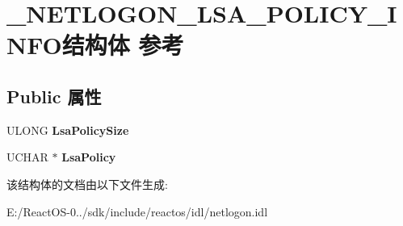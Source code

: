 \hypertarget{struct___n_e_t_l_o_g_o_n___l_s_a___p_o_l_i_c_y___i_n_f_o}{}\section{\+\_\+\+N\+E\+T\+L\+O\+G\+O\+N\+\_\+\+L\+S\+A\+\_\+\+P\+O\+L\+I\+C\+Y\+\_\+\+I\+N\+F\+O结构体 参考}
\label{struct___n_e_t_l_o_g_o_n___l_s_a___p_o_l_i_c_y___i_n_f_o}
\subsection*{Public 属性}
\begin{DoxyCompactItemize}
\item 
\mbox{\label{struct___n_e_t_l_o_g_o_n___l_s_a___p_o_l_i_c_y___i_n_f_o_a61ac6b35fd7f3f0c14df7fa1997fc858}} 
U\+L\+O\+NG {\bfseries Lsa\+Policy\+Size}
\item 
\mbox{\label{struct___n_e_t_l_o_g_o_n___l_s_a___p_o_l_i_c_y___i_n_f_o_a81936055df5b929cf0f7e3d465887534}} 
U\+C\+H\+AR $\ast$ {\bfseries Lsa\+Policy}
\end{DoxyCompactItemize}


该结构体的文档由以下文件生成\+:\begin{DoxyCompactItemize}
\item 
E\+:/\+React\+O\+S-\/0../sdk/include/reactos/idl/netlogon.\+idl\end{DoxyCompactItemize}
